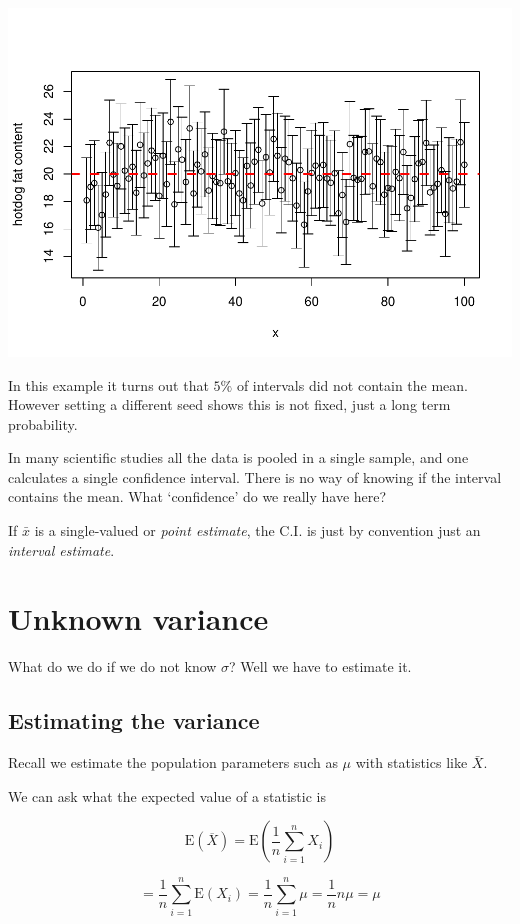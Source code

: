 \documentclass[
]{book}
\theoremstyle{definition}
\theoremstyle{definition}
\theoremstyle{definition}
\theoremstyle{definition}
\theoremstyle{remark}
\begin{document}
\includegraphics[width=0.75\linewidth]{6G4Z3008-notes_files/figure-latex/ci_sim-1}

In this example it turns out that \(5\%\) of intervals did not contain the mean. However setting a different seed shows this is not fixed, just a long term probability.

In many scientific studies all the data is pooled in a single sample, and one calculates a single confidence interval. There is no way of knowing if the interval contains the mean. What `confidence' do we really have here?

If \(\bar{x}\) is a single-valued or \emph{point estimate}, the C.I. is just by convention just an \emph{interval estimate}.

\hypertarget{unknown-variance}{%
\section{Unknown variance}\label{unknown-variance}}

What do we do if we do not know \(\sigma\)? Well we have to estimate it.

\hypertarget{estimating-the-variance}{%
\subsection{Estimating the variance}\label{estimating-the-variance}}

Recall we estimate the population parameters such as \(\mu\) with statistics like \(\bar{X}\).

We can ask what the expected value of a statistic is

\[\text{E}(\overline{X})= \text{E}\left( \frac{1}{n}\sum_{i=1}^{n}X_i \right)\]

\[=\frac{1}{n}\sum_{i=1}^{n}\text{E}(X_i) = \frac{1}{n}\sum_{i=1}^{n}\mu =\frac{1}{n}n\mu=\mu\]
\end{document}
